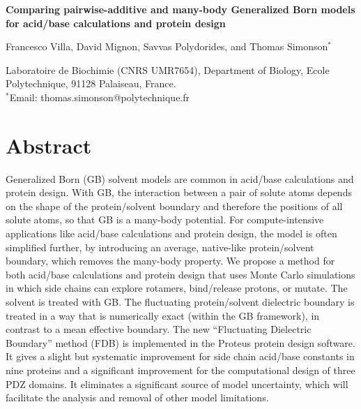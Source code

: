\documentclass[a4paper,12pt]{article}
\begin{document}
 

\parindent 0mm

\begin{center}

\Large 
{\bf Comparing pairwise-additive and many-body Generalized Born models for acid/base calculations and protein design}

\large

\vspace{.5 cm}

Francesco Villa, David Mignon, Savvas Polydorides, and Thomas Simonson$^{\ast}$

\vspace{.5 cm}

\normalsize
 
Laboratoire de Biochimie (CNRS UMR7654), Department of Biology, 
Ecole Polytechnique, 91128 Palaiseau, France. \\
$^{\ast}$Email: thomas.simonson@polytechnique.fr

\end{center}

\vspace{0.5cm}

\section*{Abstract}
Generalized Born (GB) solvent models are common in acid/base calculations and protein design. With GB, the
interaction between a pair of solute atoms depends on the shape of the protein/solvent boundary and therefore
the positions of all solute atoms, so that GB is a many-body potential. For compute-intensive applications like
acid/base calculations and protein design, the model is often simplified further, by introducing an average,
native-like protein/solvent boundary, which removes the many-body property. We propose a method for both acid/base
calculations and protein design that uses Monte Carlo simulations in which side chains can explore rotamers,
bind/release protons, or mutate. The solvent is treated with GB. The fluctuating protein/solvent dielectric
boundary is treated in a way that is numerically exact (within the GB framework), in contrast to a mean effective
boundary. The new ``Fluctuating Dielectric Boundary'' method (FDB) is implemented in the Proteus protein design
software. It gives a slight but systematic improvement for side chain acid/base constants in nine proteins and
a significant improvement for the computational design of three PDZ domains. It eliminates a significant source
of model uncertainty, which will facilitate the analysis and removal of other model limitations. 
\end{document}
